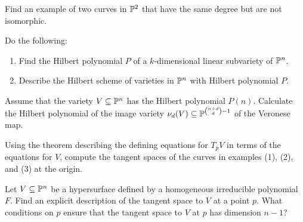 \documentclass[12pt]{memoir}
\begin{document}
\begin{Ej}
  Find an example of two curves in $\mathbb{P}^2$ that have the same
  degree but are not isomorphic.
\end{Ej}

\begin{ptcbr}
    
  \end{ptcbr}

\begin{Ej}
  Do the following:
    \begin{enumerate}
     \item Find the Hilbert polynomial $P$ of a $k$-dimensional linear
     subvariety of $\mathbb{P}^n$. 
     \item  Describe the Hilbert scheme of varieties in $\mathbb{P}^n$ with Hilbert
     polynomial $P$.
    \end{enumerate}
    
   \end{Ej}
   
   \begin{ptcbr}
       
     \end{ptcbr}

\begin{Ej}
      Assume that the variety $V\subseteq\mathbb{P}^n$ has the Hilbert polynomial
      $P(n)$. Calculate the Hilbert polynomial of the image variety $\nu_d(V)\subseteq \mathbb{P}^{\binom{n+d}{d}-1}$ of the Veronese map. 
         \end{Ej}
         
         \begin{ptcbr}
             
           \end{ptcbr}

\begin{Ej}
            Using the theorem describing the defining equations for
            $T_pV$ in terms of the equations for $V$, compute the tangent spaces of the
            curves in examples (1), (2), and (3) at the origin.
                         \end{Ej}
                         
                         \begin{ptcbr}
                             
                           \end{ptcbr}
\begin{Ej}
  Let $V\subseteq\mathbb{P}^n$ be a hypersurface defined by a homogeneous
  irreducible polynomial $F$. Find an explicit description of the tangent space
  to $V$ at a point $p$. What conditions on $p$ ensure that the tangent space to
  $V$ at $p$ has dimension $n - 1$?
                                         \end{Ej}
                                         
                                         \begin{ptcbr}
                                             
                                           \end{ptcbr}
                 
\end{document}
